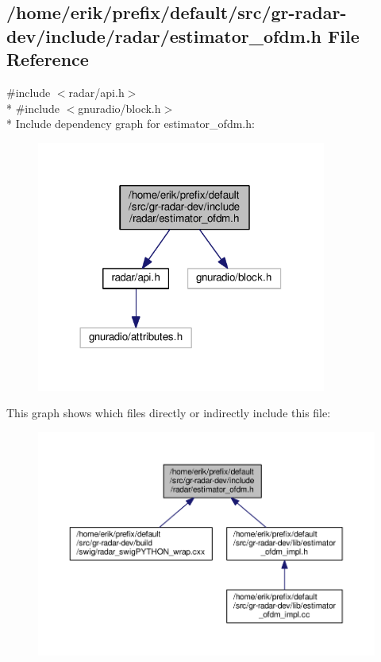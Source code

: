 \subsection{/home/erik/prefix/default/src/gr-\/radar-\/dev/include/radar/estimator\+\_\+ofdm.h File Reference}
\label{estimator__ofdm_8h}
{\ttfamily \#include $<$radar/api.\+h$>$}\\*
{\ttfamily \#include $<$gnuradio/block.\+h$>$}\\*
Include dependency graph for estimator\+\_\+ofdm.\+h\+:
\nopagebreak
\begin{figure}[H]
\begin{center}
\leavevmode
\includegraphics[width=270pt]{d9/d3b/estimator__ofdm_8h__incl}
\end{center}
\end{figure}
This graph shows which files directly or indirectly include this file\+:
\nopagebreak
\begin{figure}[H]
\begin{center}
\leavevmode
\includegraphics[width=350pt]{d2/dc7/estimator__ofdm_8h__dep__incl}
\end{center}
\end{figure}
